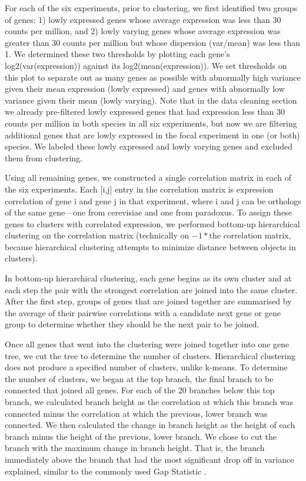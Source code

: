 For each of the six experiments, prior to clustering, we first identified two groups of genes: 1) lowly expressed genes whose average expression was less than 30 counts per million, and 2) lowly varying genes whose average expression was greater than 30 counts per million but whose dispersion (var/mean) was less than 1. We determined these two thresholds by plotting each gene's log2(var(expression)) against its log2(mean(expression)). We set thresholds on this plot to separate out as many genes as possible with abnormally high variance given their mean expression (lowly expressed) and genes with abnormally low variance given their mean (lowly varying). Note that in the data cleaning section we already pre-filtered lowly expressed genes that had expression less than 30 counts per million in both species in all six experiments, but now we are filtering additional genes that are lowly expressed in the focal experiment in one (or both) species. We labeled these lowly expressed and lowly varying genes and excluded them from clustering.

Using all remaining genes, we constructed a single correlation matrix in each of the six experiments. Each [i,j] entry in the correlation matrix is expression correlation of gene i and gene j in that experiment, where i and j can be orthologs of the same gene---one from cerevisiae and one from paradoxus. To assign these genes to clusters with correlated expression, we performed bottom-up hierarchical clustering on the correlation matrix (technically on $-1*\text{the correlation matrix}$, because hierarchical clustering attempts to minimize distance between objects in clusters). 

In bottom-up hierarchical clustering, each gene begins as its own cluster and at each step the pair with the strongest correlation are joined into the same cluster. After the first step, groups of genes that are joined together are summarised by the average of their pairwise correlations with a candidate next gene or gene group to determine whether they should be the next pair to be joined.

Once all genes that went into the clustering were joined together into one gene tree, we cut the tree to determine the number of clusters. Hierarchical clustering does not produce a specified number of clusters, unlike k-means. To determine the number of clusters, we began at the top branch, the final branch to be connected that joined all genes. For each of the 20 branches below this top branch, we calculated branch height as the correlation at which this branch was connected minus the correlation at which the previous, lower branch was connected. We then calculated the change in branch height as the height of each branch minus the height of the previous, lower branch. We chose to cut the branch with the maximum change in branch height. That is, the branch immediately above the branch that had the most significant drop off in variance explained, similar to the commonly used Gap Statistic \cite{Tibshirani2001}.

